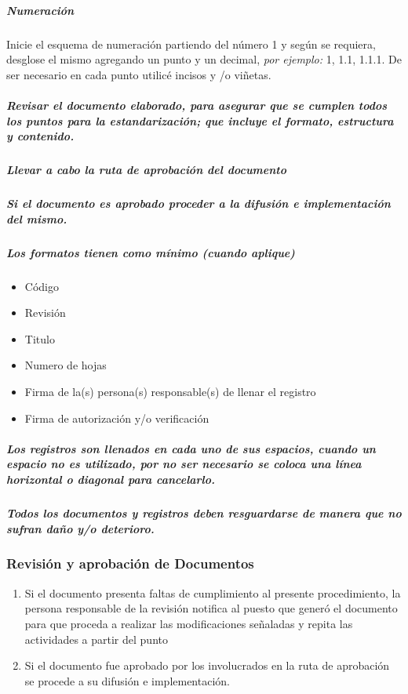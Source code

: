 \subparagraph{Numeración}
Inicie el esquema de numeración partiendo del número 1 y según se requiera, desglose el mismo agregando un punto y un decimal, \emph{por ejemplo:} 1, 1.1, 1.1.1. De ser necesario en cada punto utilicé incisos y /o viñetas.

\subparagraph{Revisar el documento elaborado, para asegurar que se cumplen todos los puntos para la estandarización; que incluye el formato, estructura y contenido.}
\subparagraph{Llevar a cabo la ruta de aprobación del documento}
\subparagraph{Si el documento es aprobado proceder a la difusión e implementación del mismo.}
\subparagraph{Los formatos tienen como mínimo (cuando aplique)}
\begin{itemize}
    \item Código 
    \item Revisión
    \item Titulo 
    \item Numero de hojas
    \item Firma de la(s) persona(s) responsable(s) de llenar el registro
    \item Firma de autorización y/o verificación
\end{itemize}

\subparagraph{Los registros son llenados en cada uno de sus espacios, cuando un espacio no es utilizado, por no ser necesario se coloca una línea horizontal o diagonal para cancelarlo.}

\subparagraph{Todos los documentos y registros deben resguardarse de manera que no sufran daño y/o deterioro.}

\subsubsection{Revisión y aprobación de Documentos} \label{RevApDoc}
\begin{enumerate}
\item Si el documento presenta faltas de cumplimiento al presente procedimiento, la persona responsable de la revisión notifica al puesto que generó el documento para que proceda a realizar las modificaciones señaladas y repita las actividades a partir del punto 
\item Si el documento fue aprobado por los involucrados en la ruta de aprobación se procede a su difusión e implementación.
\end{enumerate}

